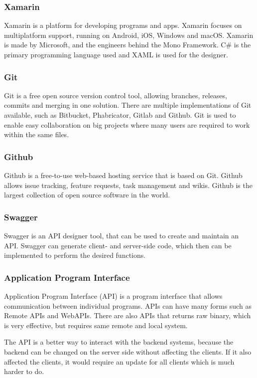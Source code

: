 \subsubsection{Xamarin}
Xamarin is a platform for developing programs and apps. Xamarin focuses on multiplatform support, running on Android, iOS, Windows and macOS. Xamarin is made by Microsoft, and the engineers behind the Mono Framework. C\# is the primary programming language used and XAML is used for the designer. \citep{cite:XamarinVS}
\subsubsection{Git}
Git is a free open source version control tool, allowing branches, releases, commits and merging in one solution. There are multiple implementations of Git available, such as Bitbucket, Phabricator, Gitlab and Github. Git is used to enable easy collaboration on big projects where many users are required to work within the same files. 
\citep{cite:Git}
\subsubsection{Github}
Github is a free-to-use web-based hosting service that is based on Git. Github allows issue tracking, feature requests, task management and wikis. Github is the largest collection of open source software in the world. 
\citep{cite:Github}
\subsubsection{Swagger}
Swagger is an API designer tool, that can be used to create and maintain an API. Swagger can generate client- and server-side code, which then can be implemented to perform the desired functions. \citep{cite:Swagger}

\subsubsection{Application Program Interface}
Application Program Interface (API) is a program interface that allows communication between individual programs. APIs can have many forms such as Remote APIs and WebAPIs. There are also APIs that returns raw binary, which is very effective, but requires same remote and local system. 

The API is a better way to interact with the backend systems, because the backend can be changed on the server side without affecting the clients. If it also affected the clients, it would require an update for all clients which is much harder to do. \citep{cite:API}

